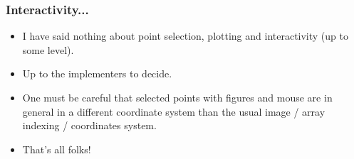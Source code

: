 \documentclass[10pt]{beamer}
\begin{document}
\begin{frame}
  \frametitle{Interactivity...}
  \begin{itemize}
  \item I have said nothing about point selection, plotting and interactivity (up to some level).
  \item Up to the implementers to decide.
  \item One must be careful that selected points with figures and mouse are in general in
    a different coordinate system than the usual image / array indexing / coordinates
    system.
  \item That's all folks!
  \end{itemize}
\end{frame}
\end{document}
